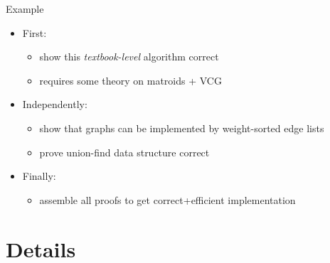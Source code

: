 \documentclass[fleqn]{beamer}
\begin{document}
\begin{frame}{Example}

  \begin{algorithmic}
        \EndIf
      \EndWhile
    \EndProcedure
  \end{algorithmic}


  \begin{itemize}
   \item First:
    \begin{itemize}
     \item show this \emph{textbook-level} algorithm correct
     \item requires some theory on matroids + VCG
    \end{itemize}
   \item Independently:
    \begin{itemize}
     \item show that graphs can be implemented by weight-sorted edge lists
     \item prove union-find data structure correct
    \end{itemize}
   \item Finally:
    \begin{itemize}
     \item assemble all proofs to get correct+efficient implementation

    \end{itemize}
  \end{itemize}
\end{frame}
\section{Details}
\end{document}

